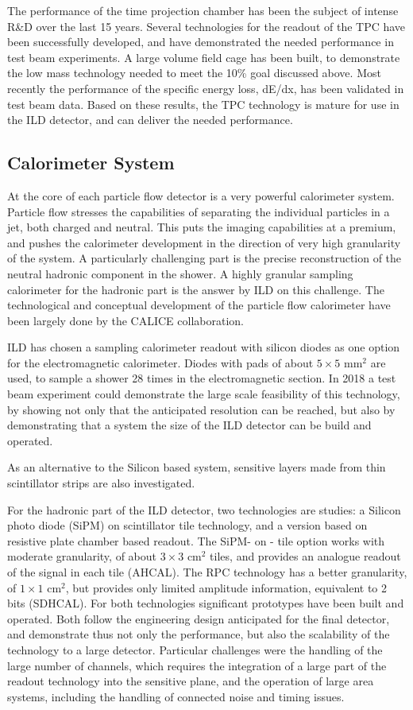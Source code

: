 \documentclass[%
 amsmath,amssymb,
 aps,
]{revtex4-1}
\begin{document}
The performance of the time projection chamber has been the subject of intense R\&D over the last 15 years. Several technologies for the readout of the TPC have been successfully developed, and have demonstrated the needed performance in test beam experiments. A large volume field cage has been built, to demonstrate the low mass technology needed to meet the 10\% goal discussed above. Most recently the performance of the specific energy loss, dE/dx, has been validated in test beam data. Based on these results, the TPC technology is mature for use in the ILD detector, and can deliver the needed performance. 


\subsection{Calorimeter System}
At the core of each particle flow detector is a very powerful calorimeter system. Particle flow stresses the capabilities of separating the individual particles in a jet, both charged and neutral. This puts the imaging capabilities at a premium, and pushes the calorimeter development in the direction of very high granularity of the system. A particularly challenging part is the precise reconstruction of the neutral hadronic component in the shower. A highly granular sampling calorimeter for the hadronic part is the answer by ILD on this challenge. The technological and conceptual development of the particle flow calorimeter have been largely done by the CALICE collaboration. 

ILD has chosen a sampling calorimeter readout with silicon diodes as one option for the electromagnetic calorimeter. Diodes with pads of about $5 \times 5$ mm$^2$ are used, to sample a shower 28 times in the electromagnetic section. In 2018 a test beam experiment could demonstrate the large scale feasibility of this technology, by showing not only that the anticipated resolution can be reached, but also by demonstrating that a system the size of the ILD detector can be build and operated. 

As an alternative to the Silicon based system, sensitive layers made from thin scintillator strips are also investigated. 

For the hadronic part of the ILD detector, two technologies are studies: a Silicon photo diode (SiPM) on scintillator tile technology, and a version based on resistive plate chamber based readout. The SiPM- on - tile option works with moderate granularity, of about $3 \times 3$ cm$^2$ tiles, and provides an analogue readout of the signal in each tile (AHCAL). The RPC technology has a better granularity, of $1 \times 1$ cm$^2$, but provides only limited amplitude information, equivalent to 2 bits (SDHCAL). For both technologies significant prototypes have been built and operated. Both follow the engineering design anticipated for the final detector, and demonstrate thus not only the performance, but also the scalability of the technology to a large detector. Particular challenges were the handling of the large number of channels, which requires the integration of a large part of the readout technology into the sensitive plane, and the operation of large area systems, including the handling of connected noise and timing issues. 
\end{document}
